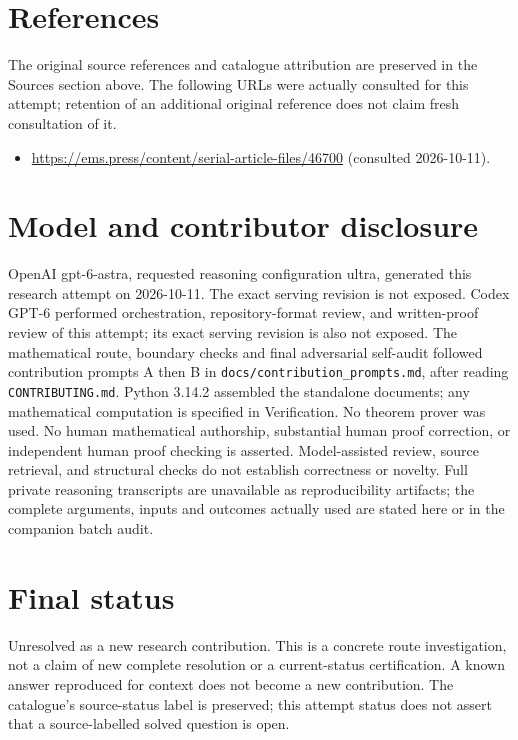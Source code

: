 \documentclass[11pt]{article}
\begin{document}
\section{References}
The original source references and catalogue attribution are preserved in the
Sources section above. The following URLs were actually consulted for this attempt;
retention of an additional original reference does not claim fresh consultation of it.
\begin{itemize}
\item \url{https://ems.press/content/serial-article-files/46700} (consulted 2026-10-11). 
\end{itemize}
\section{Model and contributor disclosure}
OpenAI gpt-6-astra, requested reasoning configuration ultra, generated this research
attempt on 2026-10-11. The exact serving revision is not exposed. Codex GPT-6
performed orchestration, repository-format review, and written-proof review of this attempt; its exact serving revision
is also not exposed. The mathematical route, boundary checks and final adversarial
self-audit followed contribution prompts A then B in
\texttt{docs/contribution\_prompts.md}, after reading \texttt{CONTRIBUTING.md}.
Python 3.14.2 assembled the standalone documents; any mathematical computation is
specified in Verification. No theorem prover was used. No human mathematical
authorship, substantial human proof correction, or independent human proof checking
is asserted. Model-assisted review, source retrieval, and structural checks do not
establish correctness or novelty. Full private reasoning transcripts are unavailable
as reproducibility artifacts; the complete arguments, inputs and outcomes actually
used are stated here or in the companion batch audit.
\section{Final status}
Unresolved as a new research contribution. This is a concrete route investigation,
not a claim of new complete resolution or a current-status certification. A known
answer reproduced for context does not become a new contribution. The catalogue's
source-status label is preserved; this attempt status does not assert that a
source-labelled solved question is open.
\end{document}
